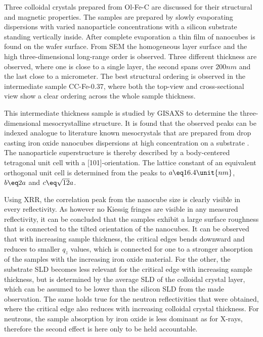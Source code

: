 \documentclass[\main/dresen_thesis.tex]{subfiles}
\begin{document}
  \label{sec:colloidalCrystals:colloidalCrystals:summary}
  Three colloidal crystals prepared from Ol-Fe-C are discussed for their structural and magnetic properties.
  The samples are prepared by slowly evaporating dispersions with varied nanoparticle concentrations with a silicon substrate standing vertically inside.
  After complete evaporation a thin film of nanocubes is found on the wafer surface.
  From SEM the homogeneous layer surface and the high three-dimensional long-range order is observed.
  Three different thickness are observed, where one is close to a single layer, the second spans over $200 \unit{nm}$ and the last close to a micrometer.
  The best structural ordering is observed in the intermediate sample CC-Fe-0.37, where both the top-view and cross-sectional view show a clear ordering across the whole sample thickness.

  This intermediate thickness sample is studied by GISAXS to determine the three-dimensional mesocrystalline structure.
  It is found that the observed peaks can be indexed analogue to literature known mesocrystals that are prepared from drop casting iron oxide nanocubes dispersions at high concentration on a substrate \cite{Wetterskog_2016_Tunin}.
  The nanoparticle superstructure is thereby described by a body-centered tetragonal unit cell with a [101]-orientation.
  The lattice constant of an equivalent orthogonal unit cell is determined from the peaks to $a \eq 16.4 \unit{nm}$, $b\eq 2a$ and $c\eq \sqrt{12} a$.

  Using XRR, the correlation peak from the nanocube size is clearly visible in every reflectivity.
  As however no Kiessig fringes are visible in any measured reflectivity, it can be concluded that the samples exhibit a large surface roughness that is connected to the tilted orientation of the nanocubes.
  It can be observed that with increasing sample thickness, the critical edges bends downward and reduces to smaller $q_z$ values, which is connected for one to a stronger absorption of the samples with the increasing iron oxide material.
  For the other, the substrate SLD becomes less relevant for the critical edge with increasing sample thickness, but is determined by the average SLD of the colloidal crystal layer, which can be assumed to be lower than the silicon SLD from the made observation.
  The same holds true for the neutron reflectivities that were obtained, where the critical edge also reduces with increasing colloidal crystal thickness.
  For neutrons, the sample absorption by iron oxide is less dominant as for X-rays, therefore the second effect is here only to be held accountable.
  \\
\end{document}

